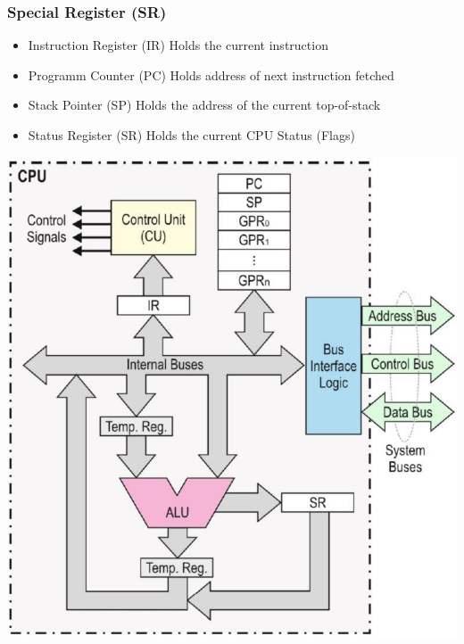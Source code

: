 \begin{multicols}{2}
	\subsubsection{Special Register (\acs{SR})}	
	\begin{itemize}
		\item Instruction Register (\acs{IR})
		\subitem Holds the current instruction 
		\item Programm Counter (\acs{PC})
		\subitem Holds address of next instruction fetched
		\item Stack Pointer (\acs{SP})
		\subitem Holds the address of the current top-of-stack 
		\item Status Register (\acs{SR})
		\subitem Holds the current \acs{CPU} Status (Flags)
	\end{itemize}
\vfill
\columnbreak
\begin{minipage}{\linewidth}
    \includegraphics[width=\linewidth]{images/CPUComponents}	
\end{minipage}


\end{multicols}
